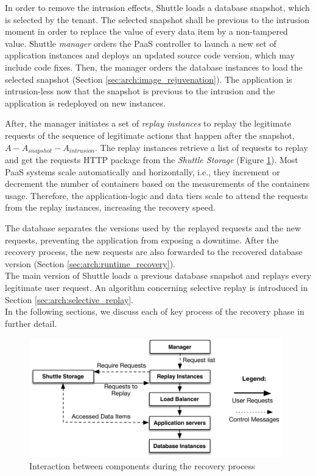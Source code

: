 In order to remove the intrusion effects, Shuttle loads a database snapshot, which is selected by the tenant. The selected snapshot shall be previous to the intrusion moment in order to replace the value of every data item by a non-tampered value. Shuttle \textit{manager} orders the \ac{PaaS} controller to launch a new set of application instances and deploys an updated source code version, which may include code fixes. Then, the manager orders the database instances to load the selected snapshot (Section \ref{sec:arch:image_rejuvenation}). The application is intrusion-less now that the snapshot is previous to the intrusion and the application is redeployed on new instances. 

After, the manager initiates a set of \textit{replay instances} to replay the legitimate requests of the sequence of legitimate actions that happen after the snapshot, $A-A_{snapshot}-A_{intrusion}$. The replay instances retrieve a list of requests to replay and get the requests \ac{HTTP} package from the \emph{Shuttle Storage} (Figure \ref{fig:replay_execution}). Most \ac{PaaS} systems scale automatically and horizontally, i.e., they increment or decrement the number of containers based on the measurements of the containers usage. Therefore, the application-logic and data tiers scale to attend the requests from the replay instances, increasing the recovery speed.

The database separates the versions used by the replayed requests and the new requests, preventing the application from exposing a downtime. After the recovery process, the new requests are also forwarded to the recovered database version (Section \ref{sec:arch:runtime_recovery}).\\


The main version of Shuttle loads a previous database snapshot and replays every legitimate user request. An algorithm concerning selective replay is introduced in Section \ref{sec:arch:selective_replay}. \\

In the following sections, we discuss each of key process of the recovery phase in further detail.

\begin{figure}
\centering
\includegraphics[width=110mm]{images/replayExecution}
\caption{Interaction between components during the recovery process}
\label{fig:replay_execution}
\end{figure}









